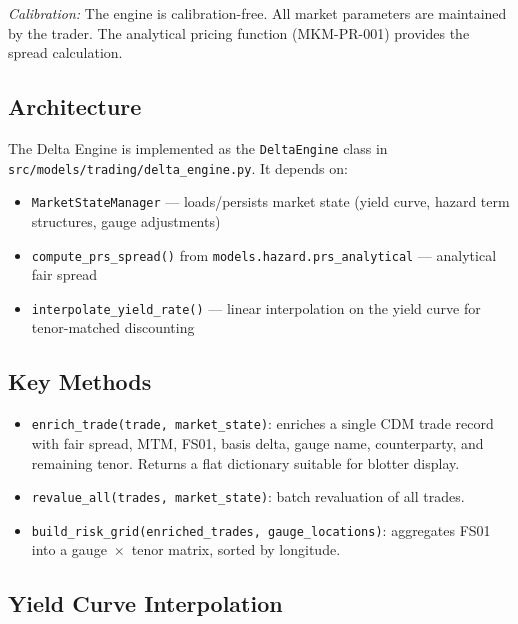 \documentclass[11pt,a4paper]{article}
\begin{document}
\emph{Calibration:} The engine is calibration-free. All market parameters are maintained by the trader. The analytical pricing function (MKM-PR-001) provides the spread calculation.

\clearpage

\mkmimplementation

\subsection{Architecture}

The Delta Engine is implemented as the \texttt{DeltaEngine} class in \texttt{src/models/trading/delta\_engine.py}. It depends on:
\begin{itemize}
    \item \texttt{MarketStateManager} --- loads/persists market state (yield curve, hazard term structures, gauge adjustments)
    \item \texttt{compute\_prs\_spread()} from \texttt{models.hazard.prs\_analytical} --- analytical fair spread
    \item \texttt{interpolate\_yield\_rate()} --- linear interpolation on the yield curve for tenor-matched discounting
\end{itemize}

\subsection{Key Methods}

\begin{itemize}
    \item \texttt{enrich\_trade(trade, market\_state)}: enriches a single CDM trade record with fair spread, MTM, FS01, basis delta, gauge name, counterparty, and remaining tenor. Returns a flat dictionary suitable for blotter display.
    \item \texttt{revalue\_all(trades, market\_state)}: batch revaluation of all trades.
    \item \texttt{build\_risk\_grid(enriched\_trades, gauge\_locations)}: aggregates FS01 into a gauge~$\times$~tenor matrix, sorted by longitude.
\end{itemize}

\subsection{Yield Curve Interpolation}
\end{document}

